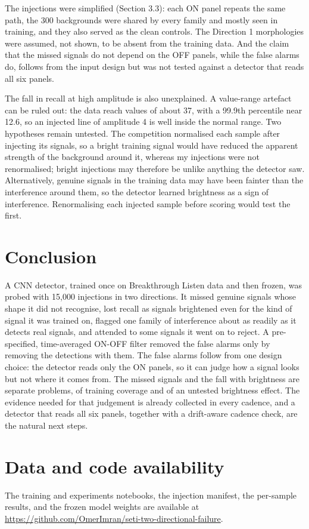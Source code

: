 \documentclass[11pt]{article}
\begin{document}
The injections were simplified (Section 3.3): each ON panel repeats the same path, the 300 backgrounds were shared by every family and mostly seen in training, and they also served as the clean controls. The Direction 1 morphologies were assumed, not shown, to be absent from the training data. And the claim that the missed signals do not depend on the OFF panels, while the false alarms do, follows from the input design but was not tested against a detector that reads all six panels.

The fall in recall at high amplitude is also unexplained. A value-range artefact can be ruled out: the data reach values of about 37, with a 99.9th percentile near 12.6, so an injected line of amplitude 4 is well inside the normal range. Two hypotheses remain untested. The competition normalised each sample after injecting its signals, so a bright training signal would have reduced the apparent strength of the background around it, whereas my injections were not renormalised; bright injections may therefore be unlike anything the detector saw. Alternatively, genuine signals in the training data may have been fainter than the interference around them, so the detector learned brightness as a sign of interference. Renormalising each injected sample before scoring would test the first.

\section{Conclusion}
A CNN detector, trained once on Breakthrough Listen data and then frozen, was probed with 15,000 injections in two directions. It missed genuine signals whose shape it did not recognise, lost recall as signals brightened even for the kind of signal it was trained on, flagged one family of interference about as readily as it detects real signals, and attended to some signals it went on to reject. A pre-specified, time-averaged ON-OFF filter removed the false alarms only by removing the detections with them. The false alarms follow from one design choice: the detector reads only the ON panels, so it can judge how a signal looks but not where it comes from. The missed signals and the fall with brightness are separate problems, of training coverage and of an untested brightness effect. The evidence needed for that judgement is already collected in every cadence, and a detector that reads all six panels, together with a drift-aware cadence check, are the natural next steps.

\section*{Data and code availability}
The training and experiments notebooks, the injection manifest, the per-sample results, and the frozen model weights are available at \url{https://github.com/OmerImran/seti-two-directional-failure}.
\end{document}
